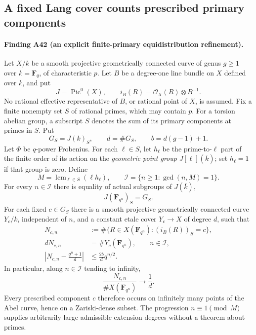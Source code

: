 \subsection{A fixed Lang cover counts prescribed primary components}
\label{sec:fixed-lang-density}

\paragraph{Finding A42 (an explicit finite-primary equidistribution refinement).}
Let $X/k$ be a smooth projective geometrically connected curve of
genus $g\ge1$ over $k=\mathbf F_q$, of characteristic $p$.
Let $B$ be a degree-one line bundle on $X$ defined over $k$, and put
\[
 J=\operatorname{Pic}^0(X),\qquad
 i_B(R)=\mathcal O_X(R)\otimes B^{-1}.
 \tag{PE.1}
\]
No rational effective representative of $B$, or rational point of
$X$, is assumed. Fix a finite nonempty set $S$ of rational primes,
which may contain $p$. For a torsion abelian group, a subscript $S$
denotes the sum of its primary components at primes in $S$. Put
\[
 G_S=J(k)_S,\qquad d=\#G_S,\qquad b=d(g-1)+1.
 \tag{PE.2}
\]
Let $\Phi$ be $q$-power Frobenius. For each $\ell\in S$, let
$h_\ell$ be the prime-to-$\ell$ part of the finite order of its
action on the \emph{geometric point group}
$J[\ell](\overline k)$; set $h_\ell=1$ if that group is zero.
Define
\[
 M=\operatorname{lcm}_{\ell\in S}(\ell h_\ell),\qquad
 \mathcal I=\{n\ge1:\gcd(n,M)=1\}.
 \tag{PE.3}
\]
For every $n\in\mathcal I$ there is equality of actual subgroups
of $J(\overline k)$,
\[
                    J(\mathbf F_{q^n})_S=G_S.
 \tag{PE.4}
\]
For each fixed $c\in G_S$ there is a smooth projective
geometrically connected curve $Y_c/k$, independent of $n$, and a
constant etale cover $Y_c\to X$ of degree $d$, such that
\[
 \begin{aligned}
 N_{c,n}&:=\#\{R\in X(\mathbf F_{q^n}):(i_B(R))_S=c\},\\
 dN_{c,n}&=\#Y_c(\mathbf F_{q^n}),\qquad n\in\mathcal I,\\
 \left|N_{c,n}-\frac{q^n+1}{d}\right|
             &\le\frac{2b}{d}q^{n/2}.
 \end{aligned}
 \tag{PE.5}
\]
In particular, along $n\in\mathcal I$ tending to infinity,
\[
                \frac{N_{c,n}}{\#X(\mathbf F_{q^n})}
                           \longrightarrow\frac1d.
 \tag{PE.6}
\]
Every prescribed component $c$ therefore occurs on infinitely
many points of the Abel curve, hence on a Zariski-dense subset.
The progression $n\equiv1\pmod M$ supplies arbitrarily large
admissible extension degrees without a theorem about primes.

